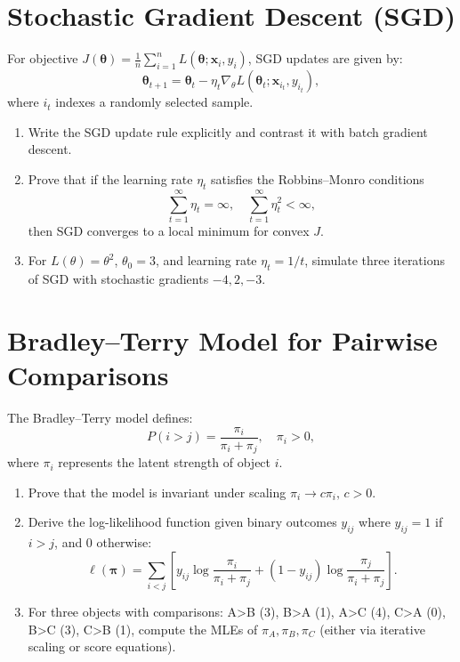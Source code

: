 \documentclass[12pt,a4paper]{article}
\begin{document}
\section{Stochastic Gradient Descent (SGD)}
For objective \( J(\boldsymbol{\theta}) = \frac{1}{n}\sum_{i=1}^n L(\boldsymbol{\theta};\mathbf{x}_i,y_i) \),
SGD updates are given by:
\[
\boldsymbol{\theta}_{t+1} = \boldsymbol{\theta}_t - \eta_t \nabla_\theta L(\boldsymbol{\theta}_t;\mathbf{x}_{i_t},y_{i_t}),
\]
where \( i_t \) indexes a randomly selected sample.
\begin{enumerate}[label=(\arabic*)]
\item Write the SGD update rule explicitly and contrast it with batch gradient descent.
\item Prove that if the learning rate \( \eta_t \) satisfies the Robbins–Monro conditions
\[
\sum_{t=1}^\infty \eta_t = \infty, \quad \sum_{t=1}^\infty \eta_t^2 < \infty,
\]
then SGD converges to a local minimum for convex \( J \).
\item For \( L(\theta)=\theta^2 \), \( \theta_0=3 \), and learning rate \( \eta_t=1/t \),
simulate three iterations of SGD with stochastic gradients \( -4,2,-3 \).
\end{enumerate}

\section{Bradley–Terry Model for Pairwise Comparisons}
The Bradley–Terry model defines:
\[
P(i>j) = \frac{\pi_i}{\pi_i + \pi_j}, \quad \pi_i>0,
\]
where \( \pi_i \) represents the latent strength of object \( i \).
\begin{enumerate}[label=(\arabic*)]
\item Prove that the model is invariant under scaling \( \pi_i \to c\pi_i,\, c>0 \).
\item Derive the log-likelihood function given binary outcomes \( y_{ij} \) where \( y_{ij}=1 \) if \( i>j \), and 0 otherwise:
\[
\ell(\boldsymbol{\pi}) = \sum_{i<j} \left[ y_{ij}\log\frac{\pi_i}{\pi_i+\pi_j} + (1-y_{ij})\log\frac{\pi_j}{\pi_i+\pi_j} \right].
\]
\item For three objects with comparisons:
A>B (3), B>A (1), A>C (4), C>A (0), B>C (3), C>B (1),
compute the MLEs of \( \pi_A,\pi_B,\pi_C \) (either via iterative scaling or score equations).
\end{enumerate}

\end{document}
